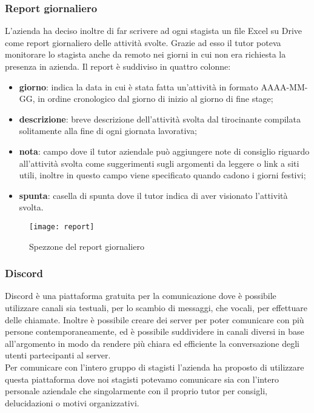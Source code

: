 \subsubsection{Report giornaliero}
\label{subsubsec:report}
L'azienda ha deciso inoltre di far scrivere ad ogni stagista un file Excel su Drive come report giornaliero delle attività svolte. Grazie ad esso il tutor poteva monitorare lo stagista anche da remoto nei giorni in cui non era richiesta la presenza in azienda. Il report è suddiviso in quattro colonne:
\begin{itemize}
	\item \textbf{giorno}: indica la data in cui è stata fatta un'attività in formato AAAA-MM-GG, in ordine cronologico dal giorno di inizio al giorno di fine stage;
	\item \textbf{descrizione}: breve descrizione dell'attività svolta dal tirocinante compilata solitamente alla fine di ogni giornata lavorativa;
	\item \textbf{nota}: campo dove il tutor aziendale può aggiungere note di consiglio riguardo all'attività svolta come suggerimenti sugli argomenti da leggere o link a siti utili, inoltre in questo campo viene specificato quando cadono i giorni festivi;
	\item \textbf{spunta}: casella di spunta dove il tutor indica di aver visionato l'attività svolta.
\end{itemize}

\begin{figure}[H]
	\begin{center}
		\texttt{[image: report]}
		\caption{Spezzone del report giornaliero}
	\end{center}
\end{figure}


\subsubsection{Discord}
\label{subsubsec:discord}
Discord è una piattaforma gratuita per la comunicazione dove è possibile utilizzare canali sia testuali, per lo scambio di messaggi, che vocali, per effettuare delle chiamate. Inoltre è possibile creare dei server per poter comunicare con più persone contemporaneamente, ed è possibile suddividere in canali diversi in base all'argomento in modo da rendere più chiara ed efficiente la conversazione degli utenti partecipanti al server.\\
Per comunicare con l'intero gruppo di stagisti l'azienda ha proposto di utilizzare questa piattaforma dove noi stagisti potevamo comunicare sia con l'intero personale aziendale che singolarmente con il proprio tutor per consigli, delucidazioni o motivi organizzativi.

